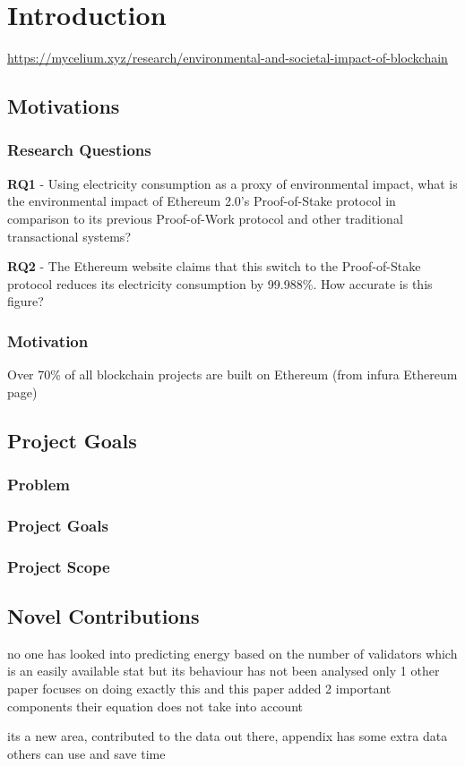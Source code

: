 \chapter{Introduction}
\url{https://mycelium.xyz/research/environmental-and-societal-impact-of-blockchain}
\section{Motivations}

\subsection{Research Questions}
\label{ResearchQuestions}
\textbf{RQ1} - Using electricity consumption as a proxy of environmental impact, what is the environmental impact of Ethereum 2.0's Proof-of-Stake protocol in comparison to its previous Proof-of-Work protocol and other traditional transactional systems?

\textbf{RQ2} - The Ethereum website claims that this switch to the Proof-of-Stake protocol reduces its electricity consumption by 99.988\%. How accurate is this figure?

\subsection{Motivation}

Over 70\% of all blockchain projects are built on Ethereum (from infura Ethereum page)


\section{Project Goals}
\label{ProjectGoals}


\subsection{Problem}

\subsection{Project Goals}

\subsection{Project Scope}

\section{Novel Contributions}

no one has looked into predicting energy based on the number of validators which is an easily available stat but its behaviour has not been analysed
only 1 other paper focuses on doing exactly this and this paper added 2 important components their equation does not take into account

its a new area, contributed to the data out there, appendix has some extra data others can use and save time